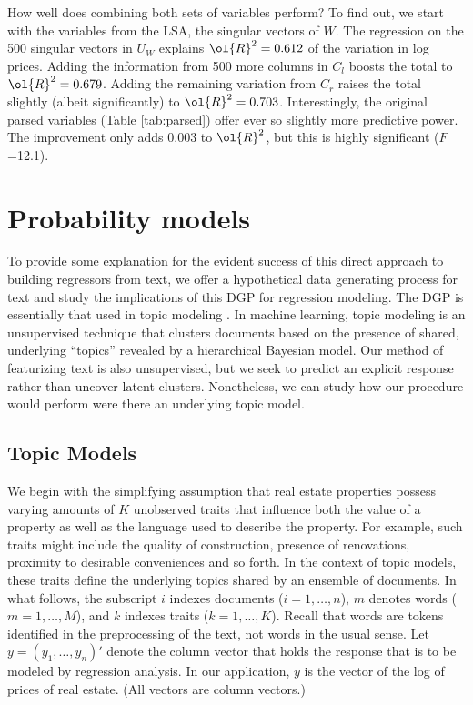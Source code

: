 \documentclass[10pt]{article}
\begin{document}
How well does combining both sets of variables perform?  To find out, we start with the variables from the LSA, the singular vectors of $W$.   The regression on the 500 singular vectors in $U_W$ explains $\ol{R}^2 = 0.612$ of the variation in log prices.  Adding the information from 500 more columns in $C_l$ boosts the total to $\ol{R}^2 = 0.679$.  Adding the remaining variation from $C_r$ raises the total slightly (albeit significantly) to $\ol{R}^2 = 0.703$. Interestingly,  the original parsed variables (Table \ref{tab:parsed}) offer ever so slightly more predictive power. The improvement only adds 0.003 to $\ol{R}^2$, but this is highly significant ($F$=12.1).


\section{Probability models}
\label{sec:topicmodels}

 To provide some explanation for the evident success of this direct approach to building regressors from text, we offer a hypothetical data generating process for text and study the implications of this DGP for regression modeling.  The DGP is essentially that used in topic modeling \citep{blei12}.  In machine learning, topic modeling is an unsupervised technique that  clusters documents based on the presence of shared, underlying ``topics'' revealed by a hierarchical Bayesian  model.  Our method of featurizing text is also unsupervised,  but we seek to predict an explicit response rather than uncover latent clusters.  Nonetheless, we can study how our procedure would perform were there an underlying topic model.


\subsection {Topic Models}  %

 We begin with the simplifying assumption that real estate properties possess
 varying amounts of $K$ unobserved traits that influence both the value of
 a property as well as the language used to describe the property.  For example,
 such traits might include the quality of construction, presence of renovations,
 proximity to desirable conveniences and so forth.  In the context of topic models, these traits define the underlying topics shared by an ensemble of documents.  In what follows, the subscript $i$ indexes documents ($i = 1,\ldots,n$), $m$ denotes words ($m=1,\ldots,M$), and $k$ indexes traits ($k = 1,\ldots,K$).  Recall that words are tokens identified in the preprocessing of the text, not words in the usual sense.   Let $y = (y_1,\ldots,y_n)'$ denote the column vector that holds the response that is to be modeled by regression analysis.    In our application, $y$ is the vector of the log of prices of real estate. (All vectors are column vectors.)
\end{document}
